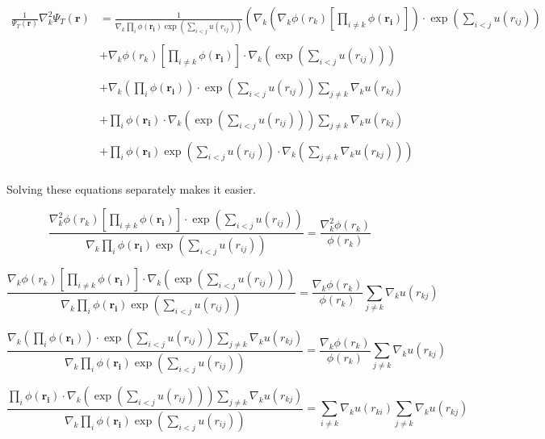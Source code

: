 \begin{align*}
\frac{1}{\Psi_T(\mathbf{r})}\nabla_k^2 \Psi_T(\mathbf{r}) &= \frac{1}{\nabla_k \prod_{i} \phi (\mathbf{r_i}) \exp \left(\sum_{i<j}u(r_{ij})\right)} \left( \nabla_k \left( \nabla_k \phi(r_k) \left[\prod_{i\ne k} \phi(\mathbf{r_i})\right] \right) \cdot \exp \left(\sum_{i<j}u(r_{ij})\right)  \right. \\
\\
&+\nabla_k \phi(r_k) \left[\prod_{i\ne k} \phi(\mathbf{r_i})\right] \cdot \nabla_k \left( \exp \left(\sum_{i<j}u(r_{ij})\right)\right)\\
\\
&+\nabla_k \left( \prod_{i} \phi (\mathbf{r_i}) \right) \cdot \exp \left(\sum_{i<j}u(r_{ij})\right) \sum_{j\ne k} \nabla_k u(r_{kj}) \\
\\
&+ \prod_{i} \phi (\mathbf{r_i}) \cdot \nabla_k \left(\exp \left(\sum_{i<j}u(r_{ij})\right)\right) \sum_{j\ne k} \nabla_k u(r_{kj})  \\
\\
&+ \left. \prod_{i} \phi (\mathbf{r_i}) \exp \left(\sum_{i<j}u(r_{ij})\right) \cdot \nabla_k \left(\sum_{j\ne k} \nabla_k u(r_{kj}) \right) \right) \\
\end{align*}

Solving these equations separately makes it easier.

$$\frac{\nabla_k^2 \phi(r_k) \left[\prod_{i\ne k} \phi(\mathbf{r_i})\right]  \cdot \exp \left(\sum_{i<j}u(r_{ij})\right)}{\nabla_k \prod_{i} \phi (\mathbf{r_i}) \exp \left(\sum_{i<j}u(r_{ij})\right)} = \frac{\nabla_k^2 \phi(r_k)}{\phi(r_k)}$$

$$\frac{\nabla_k \phi(r_k) \left[\prod_{i\ne k} \phi(\mathbf{r_i})\right] \cdot \nabla_k \left( \exp \left(\sum_{i<j}u(r_{ij})\right)\right)}{\nabla_k \prod_{i} \phi (\mathbf{r_i}) \exp \left(\sum_{i<j}u(r_{ij})\right)} = \frac{\nabla_k \phi(r_k)}{\phi(r_k)} \sum_{j \ne k} \nabla_k u(r_{kj})$$

$$\frac{\nabla_k \left( \prod_{i} \phi (\mathbf{r_i}) \right) \cdot \exp \left(\sum_{i<j}u(r_{ij})\right) \sum_{j\ne k} \nabla_k u(r_{kj})}{\nabla_k \prod_{i} \phi (\mathbf{r_i}) \exp \left(\sum_{i<j}u(r_{ij})\right)} = \frac{\nabla_k \phi(r_k)}{\phi(r_k)} \sum_{j \ne k} \nabla_k u(r_{kj})$$

$$\frac{\prod_{i} \phi (\mathbf{r_i}) \cdot \nabla_k \left(\exp \left(\sum_{i<j}u(r_{ij})\right)\right) \sum_{j\ne k} \nabla_k u(r_{kj})}{\nabla_k \prod_{i} \phi (\mathbf{r_i}) \exp \left(\sum_{i<j}u(r_{ij})\right)} =  \sum_{i \ne k} \nabla_k u(r_{ki}) \sum_{j \ne k} \nabla_k u(r_{kj})$$

